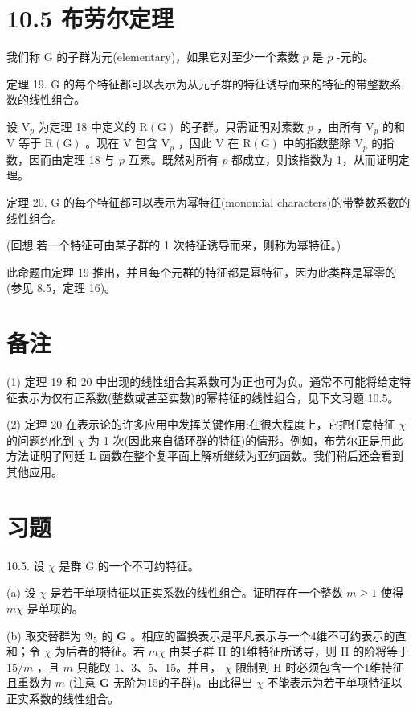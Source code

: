 \documentclass[10pt]{article}
\begin{document}
\section*{10.5 布劳尔定理}

我们称 \(\mathrm{G}\) 的子群为元(elementary)，如果它对至少一个素数 \(p\) 是 \(p\) -元的。

定理 19. \(\mathrm{G}\) 的每个特征都可以表示为从元子群的特征诱导而来的特征的带整数系数的线性组合。

设 \({\mathrm{V}}_{p}\) 为定理 18 中定义的 \(\mathrm{R}\left( \mathrm{G}\right)\) 的子群。只需证明对素数 \(p\) ，由所有 \({\mathrm{V}}_{p}\) 的和 \(\mathrm{V}\) 等于 \(\mathrm{R}\left( \mathrm{G}\right)\) 。现在 \(\mathrm{V}\) 包含 \({\mathrm{V}}_{p}\) ，因此 \(\mathrm{V}\) 在 \(\mathrm{R}\left( \mathrm{G}\right)\) 中的指数整除 \({\mathrm{V}}_{p}\) 的指数，因而由定理 18 与 \(p\) 互素。既然对所有 \(p\) 都成立，则该指数为 1，从而证明定理。

定理 20. \(\mathrm{G}\) 的每个特征都可以表示为幂特征(monomial characters)的带整数系数的线性组合。

(回想:若一个特征可由某子群的 1 次特征诱导而来，则称为幂特征。)

此命题由定理 19 推出，并且每个元群的特征都是幂特征，因为此类群是幂零的(参见 8.5，定理 16)。

\section*{备注}

(1) 定理 19 和 20 中出现的线性组合其系数可为正也可为负。通常不可能将给定特征表示为仅有正系数(整数或甚至实数)的幂特征的线性组合，见下文习题 10.5。

(2) 定理 20 在表示论的许多应用中发挥关键作用:在很大程度上，它把任意特征 \(\chi\) 的问题约化到 \(\chi\) 为 1 次(因此来自循环群的特征)的情形。例如，布劳尔正是用此方法证明了阿廷 L 函数在整个复平面上解析继续为亚纯函数。我们稍后还会看到其他应用。

\section*{习题}

10.5. 设 \(\chi\) 是群 G 的一个不可约特征。

(a) 设 \(\chi\) 是若干单项特征以正实系数的线性组合。证明存在一个整数 \(m \geq  1\) 使得 \({m\chi }\) 是单项的。

(b) 取交替群为 \({\mathfrak{A}}_{5}\) 的 \(\mathbf{G}\) 。相应的置换表示是平凡表示与一个4维不可约表示的直和；令 \(\chi\) 为后者的特征。若 \({m\chi }\) 由某子群 \(\mathrm{H}\) 的1维特征所诱导，则 \(\mathrm{H}\) 的阶将等于 \({15}/m\) ，且 \(m\) 只能取 1、3、5、15。并且， \(\chi\) 限制到 \(\mathrm{H}\) 时必须包含一个1维特征且重数为 \(m\) (注意 \(\mathbf{G}\) 无阶为15的子群)。由此得出 \(\chi\) 不能表示为若干单项特征以正实系数的线性组合。
\end{document}
